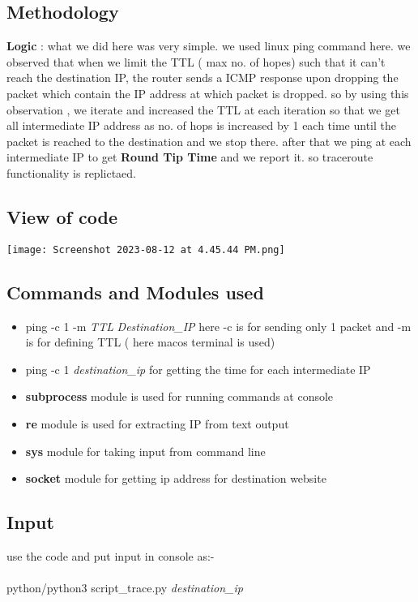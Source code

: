 \documentclass[11pt]{scrartcl}
\begin{document}
\subsection{Methodology}
\textbf{Logic} : what we did here was very simple. we used linux ping command here. we observed that when we limit the TTL ( max no. of hopes) such that it can't reach the destination IP, the router sends a ICMP response upon dropping the packet which contain the IP address at which packet is dropped. so by using this observation , we iterate and increased the TTL at each iteration so that we get all intermediate IP address as no. of hops is increased by 1 each time until the packet is reached to the destination and we stop there. after that we ping at each intermediate IP to get \textbf{Round Tip Time} and we report it. so traceroute functionality is replictaed.

\subsection{View of code}
\texttt{[image: Screenshot 2023-08-12 at 4.45.44 PM.png]}
\subsection{Commands and Modules used}
\begin{itemize}
    \item ping -c 1 -m \textit{TTL} \textit{Destination\_IP} here -c is for sending only 1 packet and -m is for defining TTL ( here macos terminal is used)
    \item ping -c 1 \textit{destination\_ip} for getting the time for each intermediate IP 
    \item \textbf{subprocess} module is used for running commands at console
    \item \textbf{re} module is used for extracting IP from text output
    \item \textbf{sys} module for taking input from command line 
    \item \textbf{socket} module for getting ip address for destination website
\end{itemize}
\subsection{Input}
use the code and put input in console as:-\\ \\
python/python3 script\_trace.py \textit{destination\_ip}
\end{document}
